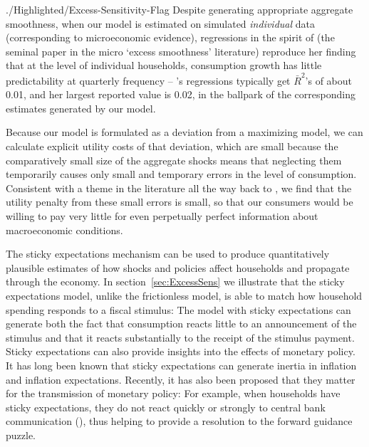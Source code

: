 \documentclass[titlepage]{\econtex}
\begin{document}
\hypertarget{dynanR2}{}
\hypertarget{Excess-Sesitivity-Flag}{} 

\begin{verbatimwrite}{./Highlighted/Excess-Sensitivity-Flag}
Despite generating appropriate aggregate smoothness, when our model is estimated on simulated \emph{individual} data (corresponding to microeconomic evidence), regressions in the spirit of  \cite{dynanHabits} (the seminal paper in the micro `excess smoothness' literature) reproduce her finding that at the level of individual households, consumption growth has little predictability at quarterly frequency -- \cite{dynanHabits}'s regressions typically get $\bar{R}^{2}$'s 
 of about 0.01, and her largest reported value is 0.02, in the ballpark of the corresponding estimates generated by our model.
\end{verbatimwrite}


Because our model is formulated as a deviation from a maximizing model, we can calculate explicit utility costs of that deviation, which are small because the comparatively small size of the aggregate shocks means that neglecting them temporarily causes only small and temporary errors in the level of consumption.  Consistent with a theme in the literature all the way back to \cite{ayNearRational}, we find that the utility penalty from these small errors is small, so that our consumers would be willing to pay very little for even perpetually perfect information about macroeconomic conditions.

The sticky expectations mechanism can be used to produce quantitatively plausible estimates of how shocks and policies affect households and propagate through the economy. In section~\ref{sec:ExcessSens} we illustrate that the sticky expectations model, unlike the frictionless model, is able to match how household spending responds to a fiscal stimulus: The model with sticky expectations can generate both the fact that consumption reacts little to an announcement of the stimulus and that it reacts substantially to the receipt of the stimulus payment. Sticky expectations can also provide insights into the effects of monetary policy. It has long been known that sticky expectations can generate inertia in inflation and inflation expectations. Recently, it has also been proposed that they matter for the transmission of monetary policy: For example, when households have sticky expectations, they do not react quickly or strongly to central bank communication (\cite{arsInvestmentInattention}), thus helping to provide a resolution to the forward guidance puzzle.
\end{document}
